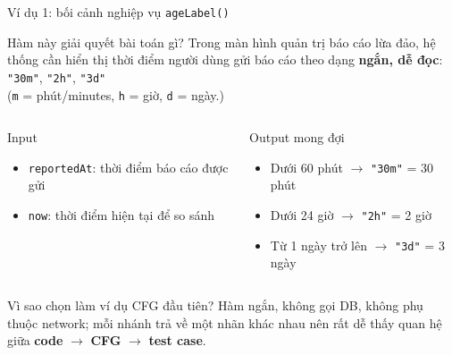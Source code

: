 \documentclass[aspectratio=169,12pt]{beamer}
\begin{document}
\begin{frame}[shrink=9]{Ví dụ 1: bối cảnh nghiệp vụ \texttt{ageLabel()}}
  \begin{block}{Hàm này giải quyết bài toán gì?}
    \small
    Trong màn hình quản trị báo cáo lừa đảo, hệ thống cần hiển thị thời điểm
    người dùng gửi báo cáo theo dạng \textbf{ngắn, dễ đọc}:
    \texttt{"30m"}, \texttt{"2h"}, \texttt{"3d"}\\
    \footnotesize(\texttt{m} = phút/minutes, \texttt{h} = giờ, \texttt{d} = ngày.)
  \end{block}

  \vspace{0.2em}
  \begin{columns}[T]
    \begin{exampleblock}{Input}
      \small
      \begin{itemize}
        \item \texttt{reportedAt}: thời điểm báo cáo được gửi
        \item \texttt{now}: thời điểm hiện tại để so sánh
      \end{itemize}
    \end{exampleblock}

    \begin{exampleblock}{Output mong đợi}
      \small
      \begin{itemize}
        \item Dưới 60 phút $\to$ \texttt{"30m"} = 30 phút
        \item Dưới 24 giờ $\to$ \texttt{"2h"} = 2 giờ
        \item Từ 1 ngày trở lên $\to$ \texttt{"3d"} = 3 ngày
      \end{itemize}
    \end{exampleblock}
  \end{columns}

  \vspace{0.25em}
  \begin{alertblock}{Vì sao chọn làm ví dụ CFG đầu tiên?}
    \small
    Hàm ngắn, không gọi DB, không phụ thuộc network; mỗi nhánh trả về một nhãn
    khác nhau nên rất dễ thấy quan hệ giữa \textbf{code} $\to$ \textbf{CFG}
    $\to$ \textbf{test case}.
  \end{alertblock}
\end{frame}
\end{document}
